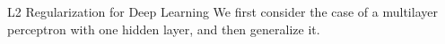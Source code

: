 %
\begin{frame}{L2 Regularization for Deep Learning}
We first consider the case of a multilayer perceptron with one hidden
layer, and then generalize it. %
%
%
%
%

\end{frame}
